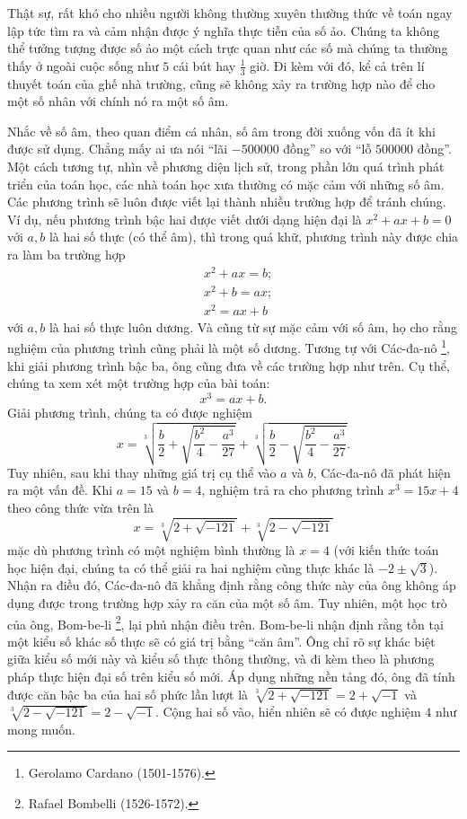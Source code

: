 \documentclass[a4paper, titlepage, openany]{book}
\newcommand\dblquote[1]{\textquotedblleft #1\textquotedblright}
\numberwithin{equation}{chapter}
\begin{document}
Thật sự, rất khó cho nhiều người không thường xuyên thường thức về toán ngay lập tức tìm ra và cảm nhận được ý nghĩa thực tiễn của số ảo. Chúng ta không thể tưởng tượng được số ảo một cách trực quan như các số mà chúng ta thường thấy ở ngoài cuộc sống như $5$ cái bút hay $\frac{1}{3}$ giờ. Đi kèm với đó, kể cả trên lí thuyết toán của ghế nhà trường, cũng sẽ không xảy ra trường hợp nào để cho một số nhân với chính nó ra một số âm. 

Nhắc về số âm, theo quan điểm cá nhân, số âm trong đời xuống vốn đã ít khi được sử dụng. Chẳng mấy ai ưa nói \dblquote{lãi $-500000$ đồng} so với \dblquote{lỗ $500000$ đồng}. Một cách tương tự, nhìn về phương diện lịch sử, trong phần lớn quá trình phát triển của toán học, các nhà toán học xưa thường có mặc cảm với những số âm. Các phương trình sẽ luôn được viết lại thành nhiều trường hợp để tránh chúng. Ví dụ, nếu phương trình bậc hai được viết dưới dạng hiện đại là $x^2 + ax+b=0$ với $a,b$ là hai số thực (có thể âm), thì trong quá khữ, phương trình này được chia ra làm ba trường hợp
\begin{align*}
   &x^2+ax = b;\\
   &x^2+b =ax;\\
   &x^2 =ax+b
\end{align*}
với $a,b$ là hai số thực luôn dương. Và cũng từ sự mặc cảm với số âm, họ cho rằng nghiệm của phương trình cũng phải là một số dương. Tương tự với Các-đa-nô \footnote{Gerolamo Cardano (1501-1576).}, khi giải phương trình bậc ba, ông cũng đưa về các trường hợp như trên. Cụ thể, chúng ta xem xét một trường hợp của bài toán: $$x^3 = ax+b.$$ Giải phương trình, chúng ta có được nghiệm $$x=\sqrt[3]{\frac{b}{2} + \sqrt{\frac{b^2}{4}-\frac{a^3}{27}}}+\sqrt[3]{\frac{b}{2} - \sqrt{\frac{b^2}{4}-\frac{a^3}{27}}}.$$ Tuy nhiên, sau khi thay những giá trị cụ thể vào $a$ và $b$, Các-đa-nô đã phát hiện ra một vấn đề. Khi $a=15$ và $b=4$, nghiệm trả ra cho phương trình $x^3 = 15x+4$ theo công thức vừa trên là $$x=\sqrt[3]{2+\sqrt{-121}}+\sqrt[3]{2-\sqrt{-121}}$$ mặc dù phương trình có một nghiệm bình thường là $x=4$ (với kiến thức toán học hiện đại, chúng ta có thể giải ra hai nghiệm cũng thực khác là $-2 \pm \sqrt{3}$). Nhận ra điều đó, Các-đa-nô đã khẳng định rằng công thức này của ông không áp dụng được trong trường hợp xảy ra căn của một số âm. Tuy nhiên, một học trò của ông, Bom-be-li \footnote{Rafael Bombelli (1526-1572).}, lại phủ nhận điều trên. Bom-be-li nhận định rằng tồn tại một kiểu số khác số thực sẽ có giá trị bằng \dblquote{căn âm}. Ông chỉ rõ sự khác biệt giữa kiểu số mới này và kiểu số thực thông thường, và đi kèm theo là phương pháp thực hiện đại số trên kiểu số mới. Áp dụng những nền tảng đó, ông đã tính được căn bậc ba của hai số phức lần lượt là $\sqrt[3]{2+\sqrt{-121}}=2+\sqrt{-1}$ và $\sqrt[3]{2-\sqrt{-121}}=2-\sqrt{-1}$. Cộng hai số vào, hiển nhiên sẽ có được nghiệm $4$ như mong muốn.
\end{document}
